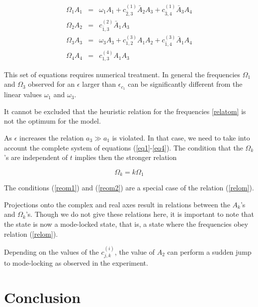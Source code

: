 \begin{enumerate}
\begin{eqnarray}
\Omega_1{A}_1&=&\omega_1A_1+c^{(1)}_{\bar{2},3}\bar{A}_2{A}_3+c^{(1)}_{\bar{3},4}\bar{A}_3A_4\\
\Omega_2{A}_2&=&c^{(2)}_{\bar{1},3}\bar{A}_1{A}_3\\
\Omega_3{A}_3&=&\omega_3A_3+c^{(3)}_{1,2}A_1A_2+c^{(3)}_{\bar{1},4}\bar{A}_1A_4\\
\Omega_4{A}_4&=&c^{(4)}_{1,3}A_1A_3
\end{eqnarray}

This set of equations requires numerical treatment. In general
the frequencies $\Omega_1$ and  $\Omega_3$ observed for an 
$\epsilon$ larger than $\epsilon_{c_1}$ can be significantly
different  from the linear values  $\omega_1$ and  $\omega_3$.

\begin{rem}
It cannot be excluded  that the  heuristic relation 
for the frequencies \ref{relatom} is not the optimum for the model.
\end{rem}
\end{enumerate}
As $\epsilon$ increases the relation
$a_3 \gg a_1$ is violated.
In that case, we need to take into account the complete system 
of equations (\ref{eq1}-\ref{eq4}).
The condition that the $\Omega_k$'s are independent of $t$
implies then the stronger relation

\begin{equation}\label{relom}
\Omega_k=k\Omega_1
\end{equation}


\begin{rem}
The conditions (\ref{reom1}) and (\ref{reom2}) are 
 a special case of the relation (\ref{relom}).
\end{rem}
Projections onto the complex and real axes result in relations
between the $A_k$'s and $\Omega_k$'s.
Though we do not give these relations here, it is important
to note that the state is now a mode-locked state, that is,
a state where the frequencies obey relation (\ref{relom}).

\begin{rem}
Depending on the values of the $c^{(i)}_{j,k}$, the value of $A_2$
can perform a sudden jump to mode-locking as observed
in the experiment.
\end{rem}




\section{Conclusion}


